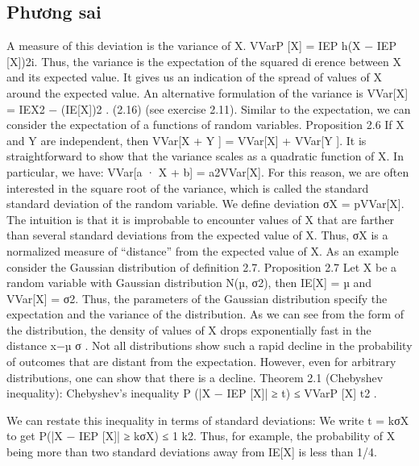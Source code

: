\subsection{Phương sai}




 A measure of this deviation is the variance of X. VVarP [X] = IEP h(X − IEP [X])2i. Thus, the variance is the expectation of the squared dierence between X and its expected value. It gives us an indication of the spread of values of X around the expected value. An alternative formulation of the variance is VVar[X] = IEX2 − (IE[X])2 . (2.16) (see exercise 2.11). Similar to the expectation, we can consider the expectation of a functions of random variables. Proposition 2.6 If X and Y are independent, then VVar[X + Y ] = VVar[X] + VVar[Y ]. It is straightforward to show that the variance scales as a quadratic function of X. In particular, we have: VVar[a · X + b] = a2VVar[X]. For this reason, we are often interested in the square root of the variance, which is called the standard standard deviation of the random variable. We define deviation σX = pVVar[X]. The intuition is that it is improbable to encounter values of X that are farther than several standard deviations from the expected value of X. Thus, σX is a normalized measure of “distance” from the expected value of X. As an example consider the Gaussian distribution of definition 2.7. Proposition 2.7 Let X be a random variable with Gaussian distribution N(µ, σ2), then IE[X] = µ and VVar[X] = σ2. Thus, the parameters of the Gaussian distribution specify the expectation and the variance of the distribution. As we can see from the form of the distribution, the density of values of X drops exponentially fast in the distance x−µ σ . Not all distributions show such a rapid decline in the probability of outcomes that are distant from the expectation. However, even for arbitrary distributions, one can show that there is a decline. Theorem 2.1 (Chebyshev inequality): Chebyshev’s inequality P (|X − IEP [X]| ≥ t) ≤ VVarP [X] t2 .

We can restate this inequality in terms of standard deviations: We write t = kσX to get P(|X − IEP [X]| ≥ kσX) ≤ 1 k2. Thus, for example, the probability of X being more than two standard deviations away from IE[X] is less than 1/4.

